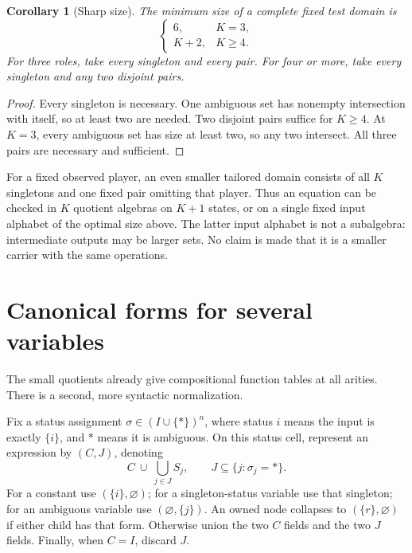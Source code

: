 \documentclass[11pt]{article}
\newtheorem{corollary}[theorem]{Corollary}
\begin{document}
\begin{corollary}[Sharp size]\label{cor:optimal}
The minimum size of a complete fixed test domain is
\[
 \begin{cases}6,&K=3,\\K+2,&K\geq4.\end{cases}
\]
For three roles, take every singleton and every pair. For four or more,
take every singleton and any two disjoint pairs.
\end{corollary}
\begin{proof}
Every singleton is necessary. One ambiguous set has nonempty
intersection with itself, so at least two are needed. Two disjoint pairs
suffice for $K\geq4$. At $K=3$, every ambiguous set has size at least
two, so any two intersect. All three pairs are necessary and sufficient.
\end{proof}

For a fixed observed player, an even smaller tailored domain consists of
all $K$ singletons and one fixed pair omitting that player. Thus an
equation can be checked in $K$ quotient algebras on $K+1$ states, or on a
single fixed input alphabet of the optimal size above. The latter input
alphabet is not a subalgebra: intermediate outputs may be larger sets.
No claim is made that it is a smaller carrier with the same operations.

\section{Canonical forms for several variables}

The small quotients already give compositional function tables at all
arities. There is a second, more syntactic normalization.

Fix a status assignment
$\sigma\in(I\cup\{*\})^n$, where status $i$ means the input is exactly
$\{i\}$, and $*$ means it is ambiguous. On this status cell, represent an
expression by $(C,J)$, denoting
\[
 C\ \cup\ \bigcup_{j\in J}S_j,
 \qquad J\subseteq\{j:\sigma_j=*\}.
\]
For a constant use $(\{i\},\varnothing)$; for a singleton-status variable
use that singleton; for an ambiguous variable use
$(\varnothing,\{j\})$. An owned node collapses to
$(\{r\},\varnothing)$ if either child has that form. Otherwise union the
two $C$ fields and the two $J$ fields. Finally, when $C=I$, discard $J$.
\end{document}

